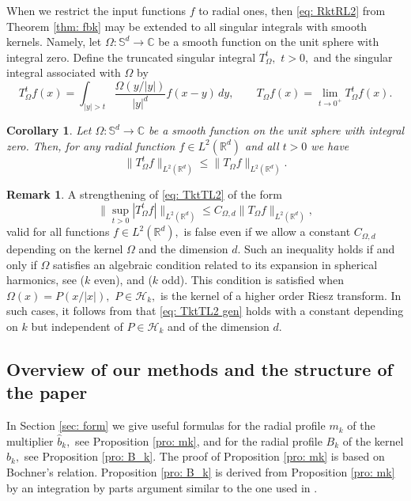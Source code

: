 \documentclass[a4paper,12pt,reqno]{amsart}
\numberwithin{equation}{section}
\newtheorem{corollary}[theorem]{Corollary}
\theoremstyle{definition}
\newtheorem{remark}[theorem]{Remark}
\newcommand{\C}{\mathbb{C}}
\newcommand{\R}{\mathbb{R}}
\newcommand{\mH}{\mathcal{H}}
\renewcommand{\le}{\leqslant}
\begin{document}
When we restrict the input functions $f$ to radial ones, then \eqref{eq: RktRL2} from Theorem \ref{thm: fbk} may be extended to all singular integrals with smooth kernels. Namely, let  $\Omega\colon \mathbb{S}^d\to \C$ be a smooth function on the unit sphere with integral zero. Define the truncated singular integral $T^t_{\Omega},$ $t>0,$ and the singular integral associated with $\Omega$ by
\[T_{\Omega}^tf(x)= \int_{|y|>t} \frac{\Omega(y/|y|)}{|y|^{d}} f(x-y) \, dy,\qquad T_{\Omega}f(x)=\lim_{t\to 0^+}T_{\Omega}^t f(x).\]


\begin{corollary}
\label{cor: gsir}
Let $\Omega\colon \mathbb{S}^d\to \C$ be a smooth function on the unit sphere with integral zero. Then, for any radial function $f\in L^2(\R^d)$ and all $t>0$ we have
\begin{equation}
\label{eq: TktTL2}
\|T_{\Omega}^tf\|_{L^2(\R^d)}\le \|T_{\Omega} f\|_{L^2(\R^d)}.
\end{equation}
\end{corollary}
\begin{remark}
    A strengthening of \eqref{eq: TktTL2} of the form
    \begin{equation}
    \label{eq: TktTL2 gen}
\|\sup_{t>0}|T_{\Omega}^tf|\|_{L^2(\R^d)}\le C_{\Omega,d}\|T_{\Omega} f\|_{L^2(\R^d)},
\end{equation}
valid for all functions $f\in L^2(\R^d),$ is false even if we allow a constant $ C_{\Omega,d}$ depending on the kernel $\Omega$ and the dimension $d.$ Such an inequality holds if and only if $\Omega$ satisfies an algebraic condition related to its expansion in spherical harmonics, see \cite[Theorem (iv)]{mov1} ($k$ even), and \cite[Theorem 1 (iv)]{mopv} ($k$ odd). This condition is satisfied when $\Omega(x)=P(x/|x|),$ $P\in\mH_k,$ is the kernel of a higher order Riesz transform. In such cases, it follows from \cite{kwz} that  \eqref{eq: TktTL2 gen} holds with a constant depending  on $k$ but independent of $P\in \mH_k$ and of the dimension $d.$  
\end{remark}


\subsection{Overview of our methods and the structure of the paper}

In Section \ref{sec: form} we give useful formulas for the radial profile $m_k$ of the multiplier $\widehat{b}_k,$ see Proposition \ref{pro: mk}, and for the radial profile $B_k$ of the kernel $b_k,$ see Proposition \ref{pro: B_k}. The proof of Proposition \ref{pro: mk} is based on Bochner's relation. Proposition \ref{pro: B_k} is derived from Proposition \ref{pro: mk} by an integration by parts argument similar to the one used in  \cite[Appendix 4.1]{LiuMeZhu}.
\end{document}
